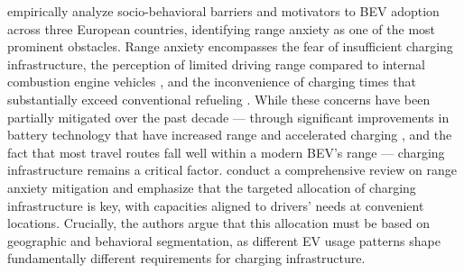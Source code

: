         \citet{SCHIAROLI2026101044} empirically analyze socio-behavioral barriers and motivators to \ac{BEV} adoption across three European countries, identifying range anxiety as one of the most prominent obstacles. Range anxiety encompasses the fear of insufficient charging infrastructure, the perception of limited driving range compared to internal combustion engine vehicles \cite{rauh2015}, and the inconvenience of charging times that substantially exceed conventional refueling \cite{Efe2018, RAINIERI202352}. While these concerns have been partially mitigated over the past decade — through significant improvements in battery technology that have increased range and accelerated charging \cite{IEA2022range}, and the fact that most travel routes fall well within a modern \ac{BEV}'s range \cite{PEARRE20111171} — charging infrastructure remains a critical factor. \citet{BADEN2025104661} conduct a comprehensive review on range anxiety mitigation and emphasize that the targeted allocation of charging infrastructure is key, with capacities aligned to drivers' needs at convenient locations. Crucially, the authors argue that this allocation must be based on geographic and behavioral segmentation, as different EV usage patterns shape fundamentally different requirements for charging infrastructure.


        

        
        

    
